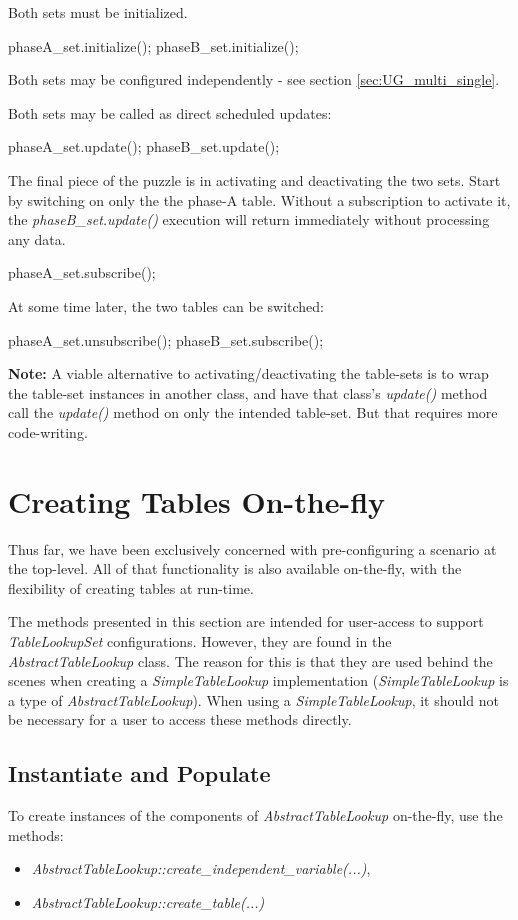\documentclass[11pt,fleqn]{report}
\begin{document}
Both sets must be initialized.
\begin{code}
phaseA_set.initialize();
phaseB_set.initialize();
\end{code}

Both sets may be configured independently - see section
\ref{sec:UG_multi_single}.

Both sets may be called as direct scheduled updates:
\begin{code}
phaseA_set.update();
phaseB_set.update();
\end{code}

The final piece of the puzzle is in activating and deactivating the two sets.
Start by switching on only the the phase-A table.
Without a subscription to activate it, the \textit{phaseB\_set.update()}
 execution will return immediately without processing any data.
\begin{code}
phaseA_set.subscribe();
\end{code}
At some time later, the two tables can be switched:
\begin{code}
phaseA_set.unsubscribe();
phaseB_set.subscribe();
\end{code}

\textbf{Note:}
A viable alternative to activating/deactivating the table-sets is to wrap the
table-set instances in another class, and have that class's \textit{update()}
method call the \textit{update()} method on only the intended table-set.
But that requires more code-writing.




\section{Creating Tables On-the-fly}
Thus far, we have been exclusively concerned with pre-configuring a scenario
at the top-level.  All of that functionality is also available on-the-fly, with
the flexibility of creating tables at run-time.

The methods presented in this section are intended for user-access to
support \textit{TableLookupSet} configurations. However, they are found in
the \textit{AbstractTableLookup} class.  The reason for this is that they are
used behind the scenes when creating a \textit{SimpleTableLookup}
implementation (\textit{SimpleTableLookup} is a type of
\textit{AbstractTableLookup}).  When using a \textit{SimpleTableLookup}, it
should not be necessary for a user to access these methods directly.

\subsection{Instantiate and Populate}
To create instances of the components of \textit{AbstractTableLookup}
on-the-fly, use the methods:
\begin{itemize}
 \item \textit{AbstractTableLookup::create\_independent\_variable(...)},
 \item \textit{AbstractTableLookup::create\_table(...)}
\end{itemize}
\end{document}

